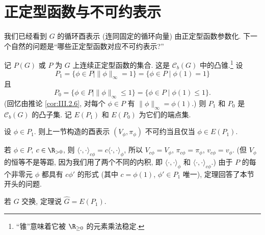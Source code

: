 \section{正定型函数与不可约表示}

我们已经看到 $G$ 的循环酉表示 (连同固定的循环向量) 由正定型函数参数化. 下一个自然的问题是``哪些正定型函数对应不可约表示?''
\begin{definition}[$P$, $P_1$, $P_0$]
\label{def:III.3.1}
记 $P(G)$ 或 $P$ 为 $G$ 上连续正定型函数的集合. 这是 $\mathcal{C}_b(G)$ 中的凸锥.\footnote{``锥''意味着它被 $\R_{\geq 0}$ 的元素乘法稳定.}
设
\[
P_1 = \{\phi \in P \mid \|\phi\|_{\infty} = 1\} = \{\phi \in P \mid \phi(1) = 1\}
\]
且
\[
P_0 = \{\phi \in P \mid \|\phi\|_{\infty} \leq 1\} = \{\phi \in P \mid \phi(1) \leq 1\}.
\]
(回忆由推论 \ref{cor:III.2.6}, 对每个 $\phi \in P$ 有 $\|\phi\|_{\infty} = \phi(1)$.)
则 $P_1$ 和 $P_0$ 是 $\mathcal{C}_b(G)$ 的凸子集. 记 $E(P_1)$ 和 $E(P_0)$ 为它们的端点集.
\end{definition}

\begin{theorem}[端点与不可约性]
\label{thm:III.3.2}
设 $\phi \in P_1$. 则上一节构造的酉表示 $(V_{\phi}, \pi_{\phi})$ 不可约当且仅当 $\phi \in E(P_1)$.
\end{theorem}

\begin{remark}[纯量倍数]
\label{rem:III.3.3}
若 $\phi \in P$, $c \in \R_{>0}$, 则 $\langle \cdot, \cdot \rangle_{c\phi} = c\langle \cdot, \cdot \rangle_{\phi}$, 所以 $V_{c\phi} = V_{\phi}$, $\pi_{c\phi} = \pi_{\phi}$, $v_{c\phi} = v_{\phi}$. (但 $V_{\phi}$ 的恒等不是等距, 因为我们用了两个不同的内积, 即 $\langle \cdot, \cdot \rangle_{\phi}$ 和 $\langle \cdot, \cdot \rangle_{c\phi}$.) 由于 $P$ 的每个非零元 $\phi$ 都具有 $c\phi'$ 的形式 (其中 $c = \phi(1)$, $\phi' \in P_1$ 唯一), 定理回答了本节开头的问题.
\end{remark}

\begin{remark}[交换群的情形]
\label{rem:III.3.4}
若 $G$ 交换, 定理说 $\widehat{G} = E(P_1)$.
\end{remark}

